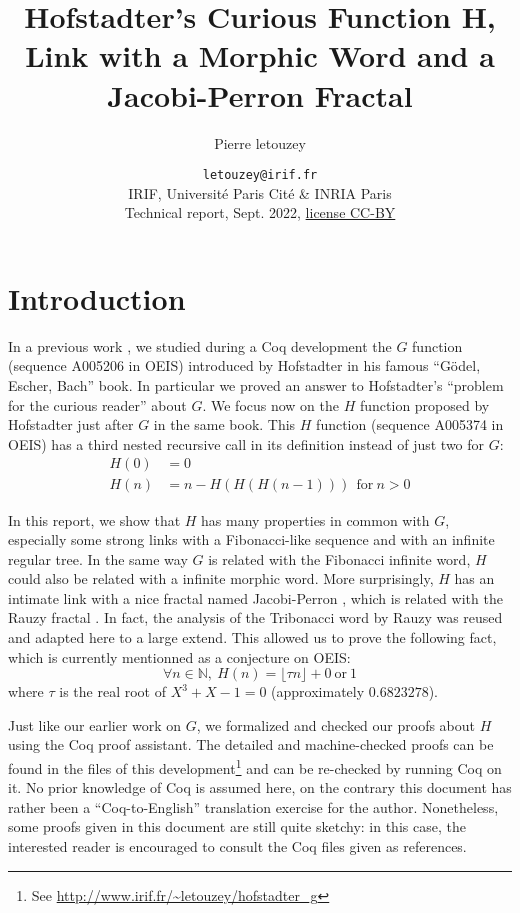 \documentclass[a4paper,11pt]{article}
\title{Hofstadter's Curious Function H,
       Link with a Morphic Word and a Jacobi-Perron Fractal}
\author{Pierre letouzey}
\date{\small
{\tt letouzey@irif.fr}\\
IRIF, Université Paris Cité \& INRIA Paris\\
Technical report, Sept. 2022, \href{http://creativecommons.org/licenses/by/4.0/}{license CC-BY}
}
\begin{document}
\newtheorem{theorem}{Theorem}
\newtheorem{definition}{Definition}
\maketitle

\newcommand{\TODO}{{\color{red} TODO}\ }

\newcommand{\docgen}[2]{\href{http://www.irif.fr/~letouzey/hofstadter_g/doc/#1.html#2}{\tt #1.v}}
\newcommand{\doc}[1]{\docgen{#1}{}}
\newcommand{\doclab}[2]{\docgen{#1}{\##2}}
\newcommand{\FG}{\ensuremath{\overline{G}}}
\newcommand{\fibrest}{\ensuremath{\Sigma A_i}}
\newcommand{\flip}{\textit{flip}}
\newcommand{\depth}{\textit{depth}}

\section{Introduction}
In a previous work \cite{??}, we studied during a Coq development the
$G$ function (sequence A005206 in OEIS\cite{OEIS-G})
introduced by Hofstadter in his famous ``Gödel, Escher, Bach'' book\cite{GEB}.
In particular we proved an answer to Hofstadter's ``problem for the curious reader'' about $G$.
We focus now on the $H$ function proposed by
Hofstadter just after $G$ in the same book. This $H$
function (sequence A005374 in OEIS\cite{OEIS-H})
has a third nested recursive call in its definition instead of just
two for $G$:
\begin{align*}
  H(0) &= 0 \\
  H(n) &= n - H(H(H(n-1))) ~~ \text{for}~n>0
\end{align*}

In this report, we show that $H$ has many properties in common with $G$,
especially some strong links with a Fibonacci-like sequence and with
an infinite regular tree. In the same way $G$ is related with the
Fibonacci infinite word, $H$ could also be related with a infinite
morphic word. More surprisingly, $H$ has an intimate link with a nice fractal
named Jacobi-Perron \cite{??}, which is related with the Rauzy fractal
\cite{??}. In fact, the analysis of the Tribonacci word by Rauzy
\cite{??} was reused and adapted here to a large extend. This allowed
us to prove the following fact, which is currently mentionned as a
conjecture on OEIS:
$$\forall n\in\mathbb{N},~H(n) = \lfloor \tau n \rfloor + 0~\text{or}~1 $$
where $\tau$ is the real root of $X^3+X-1=0$ (approximately $0.6823278$).

Just like our earlier work on $G$, we formalized and checked our
proofs about $H$ using the Coq proof assistant\cite{Coq}.
The detailed and machine-checked proofs can be found in the files
of this development\footnote{See \url{http://www.irif.fr/~letouzey/hofstadter_g}}
and can be re-checked by running Coq \cite{Coq} %
on it.
No prior knowledge of Coq is assumed here, on the contrary this
document has rather been a ``Coq-to-English'' translation
exercise for the author. Nonetheless, some proofs given in this
document are still quite sketchy: in this case, the interested
reader is encouraged to consult the Coq files given as references.
\end{document}
